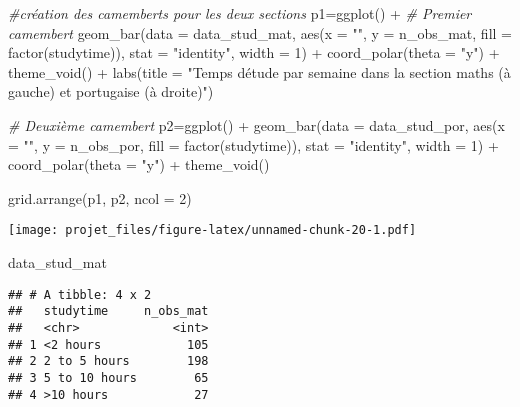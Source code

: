 \documentclass[
]{article}
\newenvironment{Shaded}{\begin{snugshade}}{\end{snugshade}}
\newcommand{\AttributeTok}[1]{\textcolor[rgb]{0.77,0.63,0.00}{#1}}
\newcommand{\CommentTok}[1]{\textcolor[rgb]{0.56,0.35,0.01}{\textit{#1}}}
\newcommand{\DecValTok}[1]{\textcolor[rgb]{0.00,0.00,0.81}{#1}}
\newcommand{\FunctionTok}[1]{\textcolor[rgb]{0.00,0.00,0.00}{#1}}
\newcommand{\NormalTok}[1]{#1}
\newcommand{\OtherTok}[1]{\textcolor[rgb]{0.56,0.35,0.01}{#1}}
\newcommand{\SpecialCharTok}[1]{\textcolor[rgb]{0.00,0.00,0.00}{#1}}
\newcommand{\StringTok}[1]{\textcolor[rgb]{0.31,0.60,0.02}{#1}}
\begin{document}
\begin{Shaded}
\begin{Highlighting}[]
\CommentTok{\#création des camemberts pour les deux sections}
\NormalTok{p1}\OtherTok{=}\FunctionTok{ggplot}\NormalTok{() }\SpecialCharTok{+}
  \CommentTok{\# Premier camembert}
  \FunctionTok{geom\_bar}\NormalTok{(}\AttributeTok{data =}\NormalTok{ data\_stud\_mat, }\FunctionTok{aes}\NormalTok{(}\AttributeTok{x =} \StringTok{""}\NormalTok{, }\AttributeTok{y =}\NormalTok{ n\_obs\_mat, }\AttributeTok{fill =} \FunctionTok{factor}\NormalTok{(studytime)), }\AttributeTok{stat =} \StringTok{"identity"}\NormalTok{, }\AttributeTok{width =} \DecValTok{1}\NormalTok{) }\SpecialCharTok{+}
  \FunctionTok{coord\_polar}\NormalTok{(}\AttributeTok{theta =} \StringTok{"y"}\NormalTok{) }\SpecialCharTok{+}
  \FunctionTok{theme\_void}\NormalTok{() }\SpecialCharTok{+}
  \FunctionTok{labs}\NormalTok{(}\AttributeTok{title =} \StringTok{"Temps d\textquotesingle{}étude par semaine dans la section maths (à gauche) et portugaise (à droite)"}\NormalTok{) }

  \CommentTok{\# Deuxième camembert}
\NormalTok{p2}\OtherTok{=}\FunctionTok{ggplot}\NormalTok{() }\SpecialCharTok{+}
  \FunctionTok{geom\_bar}\NormalTok{(}\AttributeTok{data =}\NormalTok{ data\_stud\_por, }\FunctionTok{aes}\NormalTok{(}\AttributeTok{x =} \StringTok{""}\NormalTok{, }\AttributeTok{y =}\NormalTok{ n\_obs\_por, }\AttributeTok{fill =} \FunctionTok{factor}\NormalTok{(studytime)), }\AttributeTok{stat =} \StringTok{"identity"}\NormalTok{, }\AttributeTok{width =} \DecValTok{1}\NormalTok{) }\SpecialCharTok{+}
  \FunctionTok{coord\_polar}\NormalTok{(}\AttributeTok{theta =} \StringTok{"y"}\NormalTok{) }\SpecialCharTok{+}
  \FunctionTok{theme\_void}\NormalTok{() }

\FunctionTok{grid.arrange}\NormalTok{(p1, p2, }\AttributeTok{ncol =} \DecValTok{2}\NormalTok{)}
\end{Highlighting}
\end{Shaded}

\texttt{[image: projet\_files/figure-latex/unnamed-chunk-20-1.pdf]}

\begin{Shaded}
\begin{Highlighting}[]
\NormalTok{data\_stud\_mat}
\end{Highlighting}
\end{Shaded}

\begin{verbatim}
## # A tibble: 4 x 2
##   studytime     n_obs_mat
##   <chr>             <int>
## 1 <2 hours            105
## 2 2 to 5 hours        198
## 3 5 to 10 hours        65
## 4 >10 hours            27
\end{verbatim}
\end{document}
